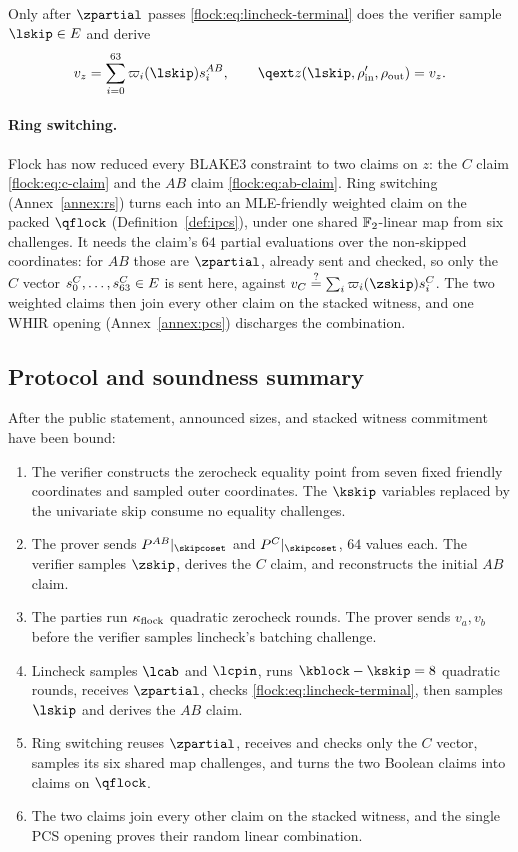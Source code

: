 Only after $\zpartial$ passes \eqref{flock:eq:lincheck-terminal} does the verifier sample $\lskip\in\E$ and derive
\begin{equation}\label{flock:eq:ab-claim}
v_z=\sum_{i=0}^{63}\lag_i(\lskip)s_i^{AB},\qquad \qext z(\lskip,\rho'_{\mathrm{in}},\rho_{\mathrm{out}})=v_z.
\end{equation}

\paragraph{Ring switching.} Flock has now reduced every BLAKE3 constraint to two claims on $z$: the $C$ claim \eqref{flock:eq:c-claim} and the $AB$ claim \eqref{flock:eq:ab-claim}. Ring switching (Annex~\ref{annex:rs}) turns each into an MLE-friendly weighted claim on the packed $\qflock$ (Definition~\ref{def:ipcs}), under one shared $\mathbb{F}_2$-linear map from six challenges. It needs the claim's $64$ partial evaluations over the non-skipped coordinates: for $AB$ those are $\zpartial$, already sent and checked, so only the $C$ vector $s_0^C,\ldots,s_{63}^C\in E$ is sent here, against $v_C\qeq\sum_i\lag_i(\zskip)s_i^C$. The two weighted claims then join every other claim on the stacked witness, and one WHIR opening (Annex~\ref{annex:pcs}) discharges the combination.

\subsection{Protocol and soundness summary}\label{flock:summary}

\begin{protocol}\label{flock:protocol}
After the public statement, announced sizes, and stacked witness commitment have been bound:
\begin{enumerate}
\item The verifier constructs the zerocheck equality point from seven fixed friendly coordinates and sampled outer coordinates. The $\kskip$ variables replaced by the univariate skip consume no equality challenges.
\item The prover sends $P^{AB}|_{\skipcoset}$ and $P^C|_{\skipcoset}$, $64$ values each. The verifier samples $\zskip$, derives the $C$ claim, and reconstructs the initial $AB$ claim.
\item The parties run $\kappa_{\mathrm{flock}}$ quadratic zerocheck rounds. The prover sends $v_a,v_b$ before the verifier samples lincheck's batching challenge.
\item Lincheck samples $\lcab$ and $\lcpin$, runs $\kblock-\kskip=8$ quadratic rounds, receives $\zpartial$, checks \eqref{flock:eq:lincheck-terminal}, then samples $\lskip$ and derives the $AB$ claim.
\item Ring switching reuses $\zpartial$, receives and checks only the $C$ vector, samples its six shared map challenges, and turns the two Boolean claims into claims on $\qflock$.
\item The two claims join every other claim on the stacked witness, and the single PCS opening proves their random linear combination.
\end{enumerate}
\end{protocol}

